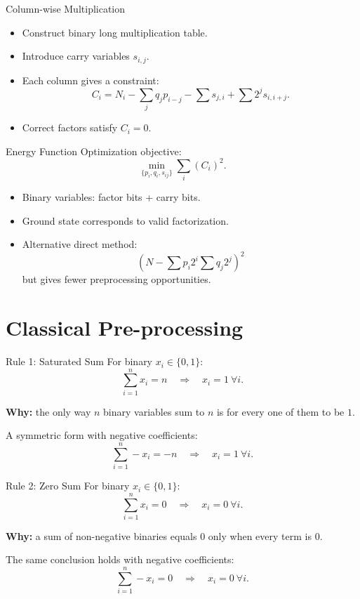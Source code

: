 \documentclass[9pt]{beamer}
\begin{document}
\begin{frame}{Column-wise Multiplication}
\begin{itemize}
\item Construct binary long multiplication table.
\item Introduce carry variables $s_{i,j}$.
\item Each column gives a constraint:
\[
C_i = N_i - \sum_{j} q_j p_{i-j}
      - \sum s_{j,i}
      + \sum 2^j s_{i,i+j}.
\]
\item Correct factors satisfy $C_i = 0$.
\end{itemize}
\end{frame}

\begin{frame}{Energy Function}
Optimization objective:
\[
\min_{\{p_i,q_i,s_{ij}\}} \sum_i (C_i)^2.
\]

\begin{itemize}
\item Binary variables: factor bits + carry bits.
\item Ground state corresponds to valid factorization.
\item Alternative direct method:
\[
\left(N-\sum p_i2^i \sum q_j2^j\right)^2
\]
but gives fewer preprocessing opportunities.
\end{itemize}
\end{frame}

\section{Classical Pre-processing}

\begin{frame}{Rule 1: Saturated Sum}
For binary $x_i \in \{0,1\}$:
\[
\sum_{i=1}^{n} x_i = n \quad\Longrightarrow\quad x_i = 1 \ \forall i.
\]

\textbf{Why:} the only way $n$ binary variables sum to $n$ is for every one of them to be $1$.

\medskip
A symmetric form with negative coefficients:
\[
\sum_{i=1}^{n} -x_i = -n \quad\Longrightarrow\quad x_i = 1 \ \forall i.
\]
\end{frame}

\begin{frame}{Rule 2: Zero Sum}
For binary $x_i \in \{0,1\}$:
\[
\sum_{i=1}^{n} x_i = 0 \quad\Longrightarrow\quad x_i = 0 \ \forall i.
\]

\textbf{Why:} a sum of non-negative binaries equals $0$ only when every term is $0$.

\medskip
The same conclusion holds with negative coefficients:
\[
\sum_{i=1}^{n} -x_i = 0 \quad\Longrightarrow\quad x_i = 0 \ \forall i.
\]
\end{frame}
\end{document}
